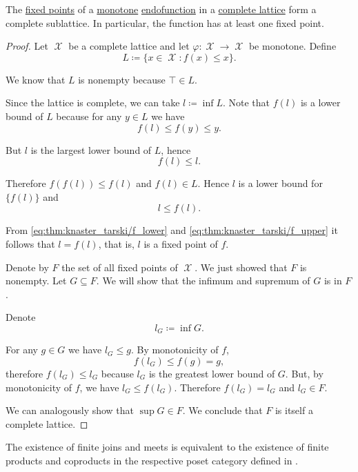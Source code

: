 \begin{proposition}\label{thm:knaster_tarski_theorem}
  The \hyperref[def:fixed_point]{fixed points} of a \hyperref[def:preordered_set/homomorphism]{monotone} \hyperref[def:endofunction]{endofunction} in a \hyperref[def:lattice]{complete lattice} form a complete sublattice. In particular, the function has at least one fixed point.
\end{proposition}
\begin{proof}
  Let \( \mscrX \) be a complete lattice and let \( \varphi: \mscrX \to \mscrX \) be monotone. Define
  \begin{equation*}
    L \coloneqq \{ x \in \mscrX \colon f(x) \leq x \}.
  \end{equation*}

  We know that \( L \) is nonempty because \( \top \in L \).

  Since the lattice is complete, we can take \( l \coloneqq \inf L \). Note that \( f(l) \) is a lower bound of \( L \) because for any \( y \in L \) we have
  \begin{equation*}
    f(l) \leq f(y) \leq y.
  \end{equation*}

  But \( l \) is the largest lower bound of \( L \), hence
  \begin{equation}\label{eq:thm:knaster_tarski/f_lower}
    f(l) \leq l.
  \end{equation}

  Therefore \( f(f(l)) \leq f(l) \) and \( f(l) \in L \). Hence \( l \) is a lower bound for \( \{ f(l) \} \) and
  \begin{equation}\label{eq:thm:knaster_tarski/f_upper}
    l \leq f(l).
  \end{equation}

  From \eqref{eq:thm:knaster_tarski/f_lower} and \eqref{eq:thm:knaster_tarski/f_upper} it follows that \( l = f(l) \), that is, \( l \) is a fixed point of \( f \).

  Denote by \( F \) the set of all fixed points of \( \mscrX \). We just showed that \( F \) is nonempty. Let \( G \subseteq F \). We will show that the infimum and supremum of \( G \) is in \( F \).

  Denote
  \begin{equation*}
    l_G \coloneqq \inf G.
  \end{equation*}

  For any \( g \in G \) we have \( l_G \leq g \). By monotonicity of \( f \),
  \begin{equation*}
    f(l_G) \leq f(g) = g,
  \end{equation*}
  therefore \( f(l_G) \leq l_G \) because \( l_G \) is the greatest lower bound of \( G \). But, by monotonicity of \( f \), we have \( l_G \leq f(l_G) \). Therefore \( f(l_G) = l_G \) and \( l_G \in F \).

  We can analogously show that \( \sup G \in F \). We conclude that \( F \) is itself a complete lattice.
\end{proof}

\begin{remark}\label{def:lattice_categorical_product}
  The existence of finite joins and meets is equivalent to the existence of finite products and coproducts in the respective poset category defined in .
\end{remark}
